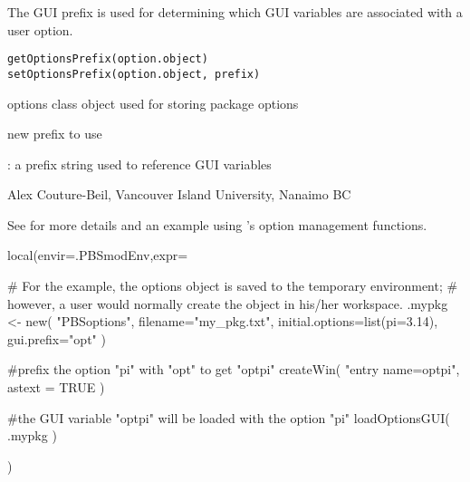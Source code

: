 \documentclass[letterpaper]{book}
\begin{document}
%
\begin{Description}\relax
The GUI prefix is used for determining which GUI variables are associated with a user option.
\end{Description}
%
\begin{Usage}
\begin{verbatim}
getOptionsPrefix(option.object)
setOptionsPrefix(option.object, prefix)
\end{verbatim}
\end{Usage}
%
\begin{Arguments}
\begin{ldescription}
\item[\code{option.object}] options class object used for storing package options
\item[\code{prefix}] new prefix to use
\end{ldescription}
\end{Arguments}
%
\begin{Value}
: a prefix string used to reference GUI variables
\end{Value}
%
\begin{Author}\relax
Alex Couture-Beil, Vancouver Island University, Nanaimo BC
\end{Author}
%
\begin{SeeAlso}\relax
See  for more details and 
an example using 's option management functions.
\end{SeeAlso}
%
\begin{Examples}
\begin{ExampleCode}
local(envir=.PBSmodEnv,expr={
  # For the example, the options object is saved to the temporary environment;
  # however, a user would normally create the object in his/her workspace.
  .mypkg <- new( "PBSoptions", filename="my_pkg.txt", 
    initial.options=list(pi=3.14), gui.prefix="opt" )

  #prefix the option "pi" with "opt" to get "optpi"
  createWin( "entry name=optpi", astext = TRUE )

  #the GUI variable "optpi" will be loaded with the option "pi"
  loadOptionsGUI( .mypkg )
})
\end{ExampleCode}
\end{Examples}
\end{document}
